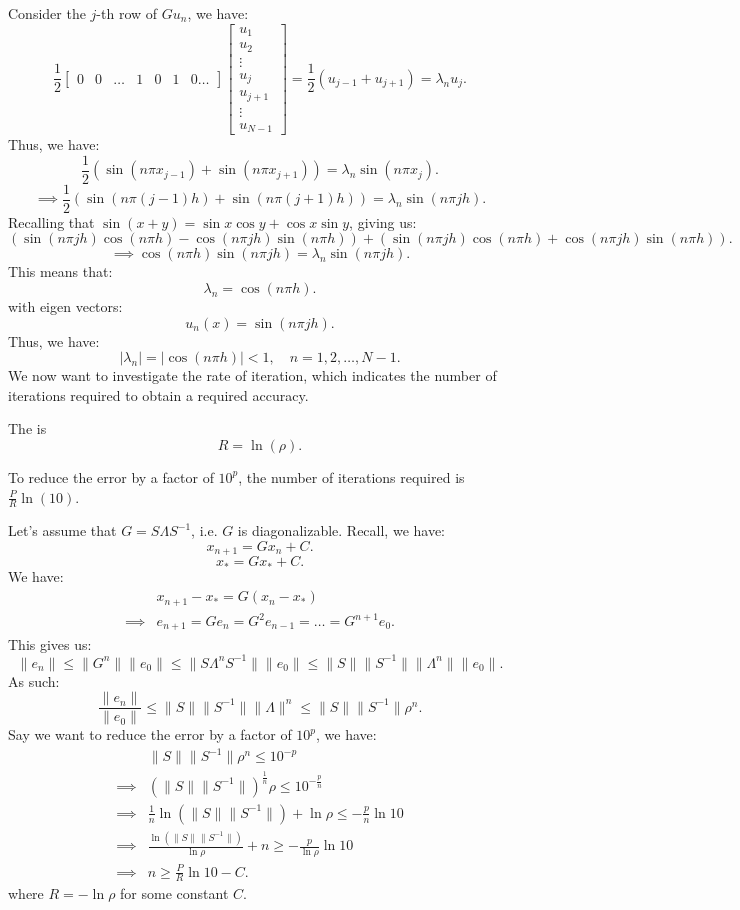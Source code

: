 \documentclass[../main/main.tex]{subfiles}
\begin{document}
Consider the $j$-th row of $G u_n$, we have:  \[
    \frac{1}{2}\begin{bmatrix} 0 & 0 & \ldots & 1 & 0 & 1 & 0 \ldots  \end{bmatrix} \begin{bmatrix} u_1 \\ u_2 \\ \vdots \\ u_j \\ u_{j+1} \\ \vdots \\u_{N-1} \end{bmatrix}   = \frac{1}{2}(u_{j-1} + u_{j+1}) = \lambda_n u_j
.\] Thus, we have: \[
\frac{1}{2}(\sin (n\pi x_{j-1}) + \sin(n\pi x_{j+1} )) = \lambda_n \sin(n\pi x_j)
.\] \[
\implies \frac{1}{2}(\sin (n\pi (j-1)h) + \sin(n\pi (j+1)h )) = \lambda_n \sin(n\pi jh)
.\] Recalling that $\sin(x+y) = \sin x \cos y + \cos x \sin y$, giving us: \[
(\sin(n\pi jh) \cos(n\pi h) - \cos(n\pi j h) \sin(n\pi h) )
+ (\sin(n\pi jh) \cos(n\pi h) + \cos(n\pi j h) \sin(n\pi h) )
.\] \[
\implies \cos(n\pi h)\sin (n\pi jh) = \lambda_n \sin(n \pi j h)
.\] This means that: \[
\lambda_n = \cos(n\pi h)
.\] with eigen vectors: \[
u_n(x) = \sin(n\pi jh)
.\] Thus, we have: \[
|\lambda_n| = |\cos(n \pi h)| < 1, \quad n = 1,2,\ldots,N-1
.\] 
We now want to investigate the rate of iteration, which indicates the number of iterations required to obtain a required accuracy.

\begin{definition}
The  is \[
        R =\ln(\rho)
    .\] 
\end{definition}
\begin{example}
    To reduce the error by a factor of $10^p$, the number of iterations required is $\frac{P}{R} \ln(10)$.
\end{example}
Let's assume that $G = S\Lambda S^{-1}$, i.e. $G$ is diagonalizable. Recall, we have:  \[
x_{n+1} = Gx_n + C
.\] \[
x_* = G x_* + C
.\] We have: 
\begin{align*} 
&x_{n+1} - x_* = G(x_n - x_{*}) \\
\implies& e_{n+1} = G e_n = G^2 e_{n-1} = \ldots = G^{n+1} e_0  
.\end{align*} This gives us: \[
\|e_n\| \le  \| G^n\| \| e_0\| \le  \| S \Lambda^n S^{-1}\| \|e_0\| \le  \| S\| \|S^{-1}\| \|\Lambda^n\| \| e_0\|
.\] 
As such: \[
\frac{\|e_n\|}{\|e_0\|} \le  \| S\| \|S^{-1}\| \|\Lambda\|^n \le  \| S\| \|S^{-1}\| \rho^n
.\] Say we want to reduce the error by a factor of $10^p$, we have: 
\begin{align*}
&\| S\| \| S^{-1}\| \rho^n \le  10^{-p} \\
    \implies& (\| S\| \| S^{-1}\|)^{\frac{1}{n}} \rho \le  10^{-\frac{p}{n}} \\
            \implies& \frac{1}{n} \ln(\| S\| \| S^{-1}\|) + \ln \rho \le  - \frac{p}{n} \ln 10  \\
            \implies & \frac{\ln(\| S\| \| S^{-1}\|)}{\ln \rho} +  n \ge   - \frac{p}{\ln \rho} \ln 10 \\
            \implies& n \ge  \frac{P}{R}\ln 10 - C
.\end{align*} where $R = -\ln \rho$ for some constant $C$.
\end{document}
